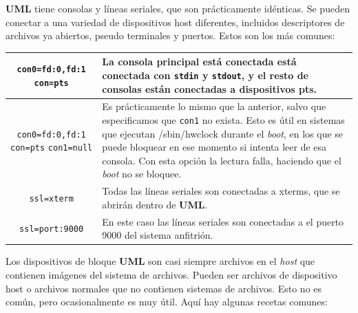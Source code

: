 \documentclass[11pt,twoside,titlepage,a4paper]{article}
\theoremstyle{definition}
\theoremstyle{plain_rojo}
\theoremstyle{remark}
\begin{document}
\textbf{UML} tiene consolas y líneas seriales, que son prácticamente idénticas. Se pueden conectar a una variedad de dispositivos host diferentes, incluidos descriptores de archivos ya abiertos, pseudo terminales y puertos.
Estos son los más comunes:
\begin{center}
\begin{tabular}{|c|p{11.4cm}|}
\hline
\parbox[t]{3cm}{\texttt{con0=fd:0,fd:1} \texttt{con=pts}}
& La consola principal está conectada está conectada con \texttt{stdin} y
\texttt{stdout}, y el resto de consolas están conectadas a dispositivos pts.
\\
\hline
\parbox[t]{3cm}{\texttt{con0=fd:0,fd:1} \texttt{con=pts} \texttt{con1=null}} 
& Es prácticamente lo mismo que la anterior, salvo que especificamos que
\texttt{con1} no exista. Esto es útil en sistemas que ejecutan /sbin/hwclock
durante el \textit{boot}, en los que se puede bloquear en ese momento si
intenta leer de esa consola. Con esta opción la lectura falla, haciendo que
el \textit{boot} no se bloquee.
\\
\hline
\texttt{ssl=xterm}
& Todas las líneas seriales son conectadas a xterms, que se abrirán dentro de
\textbf{UML}.
\\
\hline
\texttt{ssl=port:9000}
& En este caso las líneas seriales son conectadas a el puerto 9000 del 
sistema anfitrión.
\\
\hline
\end{tabular}
\end{center}
\bigskip
Los dispositivos de bloque \textbf{UML} son casi siempre archivos en el 
\emph{host} que contienen imágenes del sistema de archivos. Pueden ser 
archivos de dispositivo host o archivos normales que no contienen sistemas de 
archivos. Esto no es común, pero ocasionalmente es muy útil. Aquí hay algunas 
recetas comunes:
\end{document}
